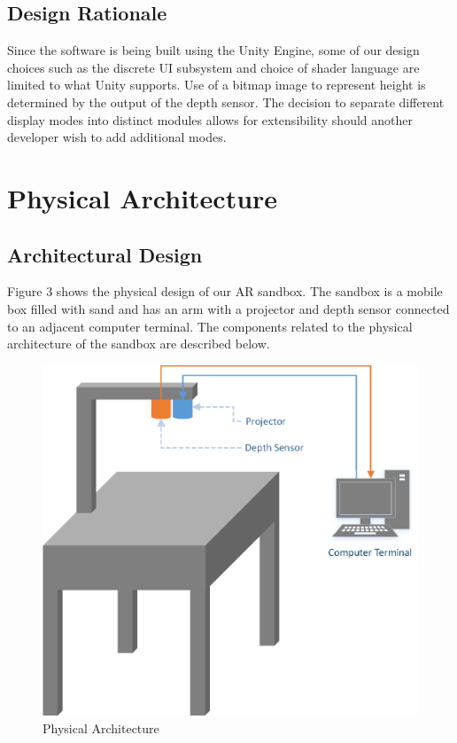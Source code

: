 \documentclass[onecolumn, draftclsnofoot,10pt, compsoc]{IEEEtran}
\begin{document}
\subsection{Design Rationale}
Since the software is being built using the Unity Engine, some of our design choices such as the discrete UI subsystem and choice of shader language are limited to what Unity supports. Use of a bitmap image to represent height is determined by the output of the depth sensor. 
The decision to separate different display modes into distinct modules allows for extensibility should another developer wish to add additional modes.

\section{Physical Architecture} %


\subsection{Architectural Design}
Figure 3 shows the physical design of our AR sandbox.
The sandbox is a mobile box filled with sand and has an arm with a projector and depth sensor connected to an adjacent computer terminal. The components related to the physical architecture of the sandbox are described below.

\begin{figure}[H]
	\centering
	\includegraphics[width=6in]{PhysicalDiagram}
    \caption{Physical Architecture}
    \label{fig:physicalarchitecture}
\end{figure}
\end{document}
